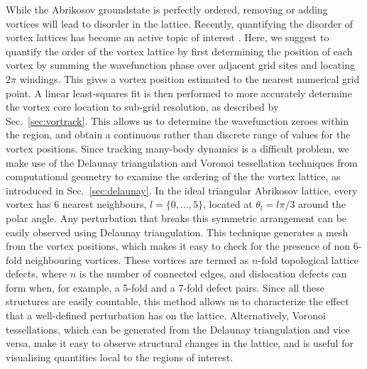 While the Abrikosov groundstate is perfectly ordered, removing or adding vortices will lead to disorder in the lattice. Recently, quantifying the disorder of vortex lattices has become an active topic of interest \cite{VTX:Mithun_pra_2016,VTX:Rankonjac_pra_2016}. %
Here, we suggest to quantify the order of the vortex lattice by first determining the position of each vortex by summing the wavefunction phase over adjacent grid sites and locating $2\pi$ windings. This gives a vortex position estimated to the nearest numerical grid point. A linear least-squares fit is then performed to more accurately determine the vortex core location to sub-grid resolution, as described by Sec.~\ref{sec:vortrack}. This allows us to determine the wavefunction zeroes within the region, and obtain a continuous rather than discrete range of values for the vortex positions. Since tracking many-body dynamics is a difficult problem, we make use of the Delaunay triangulation and Voronoi tessellation techniques from computational geometry to examine the ordering of the the vortex lattice, as introduced in Sec.~\ref{sec:delaunay}. In the ideal triangular Abrikosov lattice, every vortex has 6 nearest neighbours, $l=\{0,\ldots,5\}$, located at $\theta_l=l\pi/3$ around the polar angle. Any perturbation that breaks this symmetric arrangement can be easily observed using Delaunay triangulation. This technique generates a mesh from the vortex positions, which makes it easy to check for the presence of non 6-fold neighbouring vortices. These vortices are termed as $n$-fold topological lattice defects, where $n$ is the number of connected edges, and dislocation defects can form when, for example, a 5-fold and a 7-fold defect pairs. Since all these structures are easily countable, this method allows us to characterize the effect that a well-defined perturbation has on the lattice. Alternatively, Voronoi tessellations, which can be generated from the Delaunay triangulation and vice versa, make it easy to observe structural changes in the lattice, and is useful for visualising quantities local to the regions of interest.

